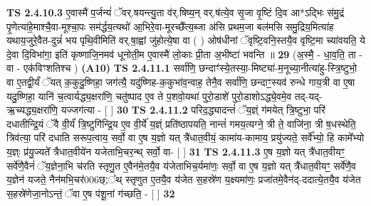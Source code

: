 \documentclass[17pt]{extarticle}
\begin{document}
                  \newline
                                \textbf{ TS 2.4.10.3} \newline
                  ए॒वास्मै॑ प॒र्जन्यं॑ ॅवर्.षयन्त्यु॒ता व॑र्.षिष्य॒न् वर्.ष॑त्ये॒व सृ॒जा वृ॒ष्टिं दि॒व आ*ऽद्भिः स॑मु॒द्रं पृ॒णेत्या॑हे॒माश्चै॒वा-मूश्चा॒पः सम॑र्द्धय॒त्यथो॑ आ॒भिरे॒वा-मूरच्छै᳚त्य॒ब्जा अ॑सि प्रथम॒जा बल॑मसि समु॒द्रिय॒मित्या॑ह यथाय॒जुरे॒वैत-दुन्नं॑ भय पृथि॒वीमिति॑ वर्.षा॒ह्वां जु॑होत्ये॒षा वा ( ) ओष॑धीनां ॅवृष्टि॒वनि॒स्तयै॒व वृष्टि॒मा च्या॑वयति॒ ये दे॒वा दि॒विभा॑गा॒ इति॑ कृष्णाजि॒नमव॑ धूनोती॒म ए॒वास्मै॑ लो॒काः प्री॒ता अ॒भीष्टा॑ भवन्ति ॥ \textbf{  29} \newline
                  \newline
                      (अ॒स्मै॒ - धा॒व॒ति॒ ता - वा - एक॑विꣳशतिश्च )  \textbf{(A10)} \newline \newline
                                        \textbf{ TS 2.4.11.1} \newline
                  सर्वा॑णि॒ छन्दाꣳ॑स्ये॒तस्या॒-मिष्ट्या॑-म॒नूच्या॒नीत्या॑हु-स्त्रि॒ष्टुभो॒ वा ए॒तद्वी॒र्यं॑ ॅयत् क॒कुदु॒ष्णिहा॒ जग॑त्यै॒ यदु॑ष्णिह-क॒कुभा॑व॒न्वाह॒ तेनै॒व सर्वा॑णि॒ छन्दाꣳ॒॒स्यव॑ रुन्धे गाय॒त्री वा ए॒षा यदु॒ष्णिहा॒ यानि॑ च॒त्वार्यद्ध्य॒क्षरा॑णि॒ चतु॑ष्पाद ए॒व ते प॒शवो॒यथा॑ पुरो॒डाशे॑ पुरो॒डाशोऽद्ध्ये॒वमे॒व तद्-यद्-ऋ॒च्यद्ध्य॒क्षरा॑णि॒ यज्जग॑त्या - [  ] \textbf{  30} \newline
                  \newline
                                \textbf{ TS 2.4.11.2} \newline
                  परिद॒द्ध्यादन्तं॑ ॅय॒ज्ञ्ं ग॑मयेत् त्रि॒ष्टुभा॒ परि॑ दधातीन्द्रि॒यं ॅवै वी॒र्यं॑ त्रि॒ष्टुगि॑न्द्रि॒य ए॒व वी॒र्ये॑ य॒ज्ञ्ं प्रति॑ष्ठापयति॒ नान्तं॑ गमय॒त्यग्ने॒ त्री ते॒ वाजि॑ना॒ त्री ष॒धस्थेति॒ त्रिव॑त्या॒ परि॑ दधाति सरूप॒त्वाय॒ सर्वो॒ वा ए॒ष य॒ज्ञो यत् त्रै॑धात॒वीयं॒ कामा॑य-कामाय॒ प्रयु॑ज्यते॒ सर्वे᳚भ्यो॒ हि कामे᳚भ्यो य॒ज्ञ्ः प्र॑यु॒ज्यते᳚ त्रैधात॒वीये॑न यजेताभि॒चर॒न्थ् सर्वो॒ वा- [  ] \textbf{  31} \newline
                  \newline
                                \textbf{ TS 2.4.11.3} \newline
                  ए॒ष य॒ज्ञो यत् त्रै॑धात॒वीयꣳ॒॒ सर्वे॑णै॒वैनं॑ ॅय॒ज्ञेना॒भि च॑रति स्तृणु॒त ए॒वैन॑मे॒तयै॒व य॑जेताभिच॒र्यमा॑णः॒ सर्वो॒ वा ए॒ष य॒ज्ञो यत् त्रै॑धात॒वीयꣳ॒॒ सर्वे॑णै॒व य॒ज्ञेन॑ यजते॒ नैन॑मभि॒चर॑006छ्;᳚थ् स्तृणुत ए॒तयै॒व य॑जेत स॒हस्रे॑ण य॒क्ष्यमा॑णः॒ प्रजा॑तमे॒वैन॑द्-ददात्ये॒तयै॒व य॑जेत स॒हस्रे॑णेजा॒नोऽन्तं॒ ॅवा ए॒ष प॑शू॒नां ग॑च्छति॒ - [  ] \textbf{  32} \newline
\end{document}
